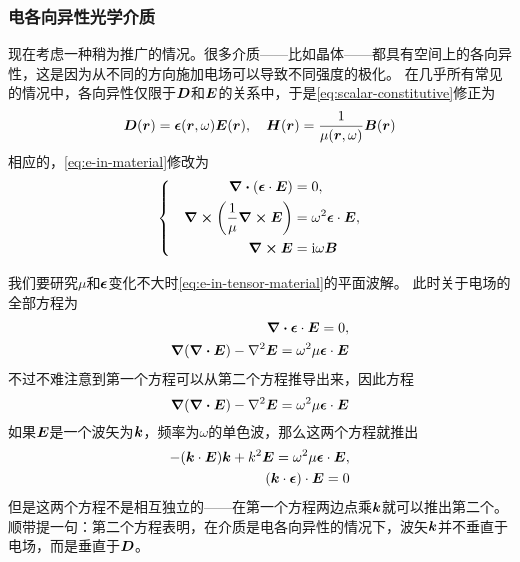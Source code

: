 \documentclass[UTF8, a4paper]{ctexart}
\newcommand*{\ii}{\mathrm{i}}
\newenvironment{bigcase}{\left\{\quad\begin{aligned}}{\end{aligned}\right.}
\begin{document}
\subsubsection{电各向异性光学介质}

现在考虑一种稍为推广的情况。很多介质——比如晶体——都具有空间上的各向异性，这是因为从不同的方向施加电场可以导致不同强度的极化。
在几乎所有常见的情况中，各向异性仅限于$\vb*{D}$和$\vb*{E}$的关系中，于是\eqref{eq:scalar-constitutive}修正为
\begin{equation}
    \vb*{D}(\vb*{r}) = \vb*{\epsilon}(\vb*{r}, \omega) \vb*{E}(\vb*{r}), \quad \vb*{H}(\vb*{r}) = \frac{1}{\mu(\vb*{r}, \omega)} \vb*{B}(\vb*{r})
    \label{eq:e-tensor-constitutive}
\end{equation}
相应的，\eqref{eq:e-in-material}修改为
\begin{equation}
    \begin{bigcase}
        \div{(\vb*{\epsilon} \cdot \vb*{E})} &= 0, \\
        \curl{ \left(\frac{1}{\mu} \curl{\vb*{E}} \right) } &= \omega^2 \vb*{\epsilon} \cdot \vb*{E}, \\
        \curl{\vb*{E}} &= \ii \omega \vb*{B}
    \end{bigcase}
    \label{eq:e-in-tensor-material}
\end{equation}

我们要研究$\mu$和$\vb*{\epsilon}$变化不大时\eqref{eq:e-in-tensor-material}的平面波解。
此时关于电场的全部方程为
\[
    \begin{split}
        \div{\vb*{\epsilon} \cdot \vb*{E}} = 0, \\
        \grad{(\div{\vb*{E}})} - \laplacian{\vb*{E}} = \omega^2 \mu \vb*{\epsilon} \cdot \vb*{E}
    \end{split}
\]
不过不难注意到第一个方程可以从第二个方程推导出来，因此方程
\begin{equation}
    \grad{(\div{\vb*{E}})} - \laplacian{\vb*{E}} = \omega^2 \mu \vb*{\epsilon} \cdot \vb*{E}
    \label{eq:anisotropy}
\end{equation}
如果$\vb*{E}$是一个波矢为$\vb*{k}$，频率为$\omega$的单色波，那么这两个方程就推出
\[
    \begin{split}
        - (\vb*{k} \cdot \vb*{E}) \vb*{k} + k^2 \vb*{E} = \omega^2 \mu \vb*{\epsilon} \cdot \vb*{E}, \\
    (\vb*{k} \cdot \vb*{\epsilon}) \cdot \vb*{E} = 0
    \end{split}
\]
但是这两个方程不是相互独立的——在第一个方程两边点乘$\vb*{k}$就可以推出第二个。
顺带提一句：第二个方程表明，在介质是电各向异性的情况下，波矢$\vb*{k}$并不垂直于电场，而是垂直于$\vb*{D}$。
\end{document}
